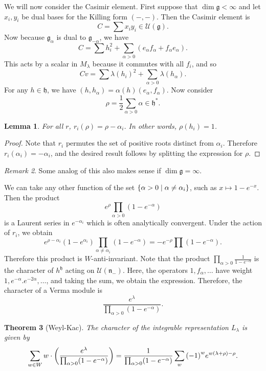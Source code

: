 \documentclass[leqno, openany]{memoir}
\newtheorem{thm}{Theorem}[section]
\newtheorem{lem}[thm]{Lemma}
\theoremstyle{definition}
\theoremstyle{remark}
\newtheorem{rmk}[thm]{Remark}
\theoremstyle{plain}
\theoremstyle{definition}
\theoremstyle{remark}
\newcommand{\mc}[1]{\mathcal{#1}}
\newcommand{\mf}[1]{\mathfrak{#1}}
\begin{document}
We will now consider the Casimir element. First suppose that $\dim \mf{g} <
\infty$ and let $x_i, y_i$ be dual bases for the Killing form $(-,-)$. Then the
Casimir element is \[ C = \sum x_i y_i \in \mc{U}(\mf{g}). \] Now because
$\mf{g}_{\alpha}$ is dual to $\mf{g}_{-\alpha}$, we have \[ C = \sum h_i^2 +
    \sum_{\alpha > 0} (e_{\alpha} f_{\alpha} + f_{\alpha} e_{\alpha}). \] This
    acts by a scalar in $M_{\lambda}$ because it commutes with all $f_i$, and
    so \[ C v = \sum { \lambda(h_i) }^2 + \sum_{\alpha > 0}
    \lambda(h_{\alpha}). \] For any $h \in \mf{h}$, we have $(h, h_{\alpha}) =
    \alpha(h) (e_{\alpha}, f_{\alpha})$. Now consider \[ \rho = \frac{1}{2}
    \sum_{\alpha >0} \alpha \in \mf{h}^*. \]

\begin{lem} For all $r$, $r_i(\rho) = \rho - \alpha_i$. In other words,
$\rho(h_i) = 1$.  \end{lem}

\begin{proof} Note that $r_i$ permutes the set of positive roots distinct from
$\alpha_i$. Therefore $r_i(\alpha_i) = -\alpha_i$, and the desired result
follows by splitting the expression for $\rho$.  \end{proof}

\begin{rmk} Some analog of this also makes sense if $\dim \mf{g} = \infty$.
\end{rmk}

We can take any other function of the set $\qty{\alpha > 0 \mid \alpha \neq
\alpha_i}$, such as $x \mapsto 1-e^{-x}$. Then the product \[ e^{\rho}
\prod_{\alpha > 0} (1-e^{-\alpha}) \] is a Laurent series in $e^{-\alpha_i}$
which is often analytically convergent. Under the action of $r_i$, we obtain \[
e^{\rho-\alpha_i} (1-e^{\alpha_i}) \prod_{\alpha \neq \alpha_i} (1-e^{-\alpha})
= -e^{-\rho} \prod (1-e^{-\alpha}). \] Therefore this product is
$W$-anti-invariant. Note that the product $\prod_{\alpha >0}
\frac{1}{1-e^{-\alpha}}$ is the character of $h^{\mf{h}}$ acting on
$\mc{U}(\mf{n}_-)$. Here, the operators $1, f_{\alpha}, \ldots$ have weight
$1,e^{-\alpha}. e^{-2\alpha},\ldots$, and taking the sum, we obtain the
expression. Therefore, the character of a Verma module is \[
\frac{e^{\lambda}}{\prod_{\alpha > 0} (1-e^{-\alpha})}. \]

\begin{thm}[Weyl-Kac] The character of the integrable representation
    $L_{\lambda}$ is given by \[ \sum_{w \in W} w \cdot
    \qty(\frac{e^{\lambda}}{\prod_{\alpha > 0} (1-e^{-\alpha})}) =
\frac{1}{\prod_{\alpha > 0}(1-e^{-\alpha})} \sum_w {(-1)}^w e^{w(\lambda +
\rho) - \rho}. \] \end{thm}
\end{document}
